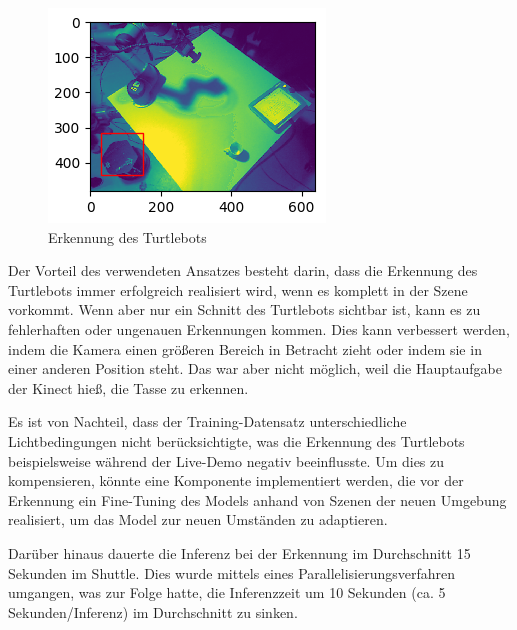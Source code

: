 \begin{figure}
\begin{minipage}[t]{.33\textwidth}
\centering
\vspace{0pt}
\includegraphics[width=\linewidth]{./images/tb3.png}
\end{minipage}\hfill
\caption{Erkennung des Turtlebots}
\end{figure}
Der Vorteil des verwendeten Ansatzes besteht darin, dass die Erkennung des Turtlebots immer erfolgreich realisiert wird, wenn es komplett in der Szene vorkommt. Wenn aber nur ein Schnitt des Turtlebots sichtbar ist, kann es zu fehlerhaften oder ungenauen Erkennungen kommen. Dies kann verbessert werden, indem die Kamera einen größeren Bereich in Betracht zieht oder indem sie in einer anderen Position steht. Das war aber nicht möglich, weil die Hauptaufgabe der Kinect hieß, die Tasse zu erkennen.

Es ist von Nachteil, dass der Training-Datensatz unterschiedliche Lichtbedingungen nicht berücksichtigte, was die Erkennung des Turtlebots beispielsweise während der Live-Demo negativ beeinflusste. Um dies zu kompensieren, könnte eine Komponente implementiert werden, die vor der Erkennung ein Fine-Tuning des Models anhand von Szenen der neuen Umgebung realisiert, um das Model zur neuen Umständen zu adaptieren.

Darüber hinaus dauerte die Inferenz bei der Erkennung im Durchschnitt 15 Sekunden im Shuttle. Dies wurde mittels eines Parallelisierungsverfahren umgangen, was zur Folge hatte, die Inferenzzeit um 10 Sekunden (ca. 5 Sekunden/Inferenz) im Durchschnitt zu sinken.